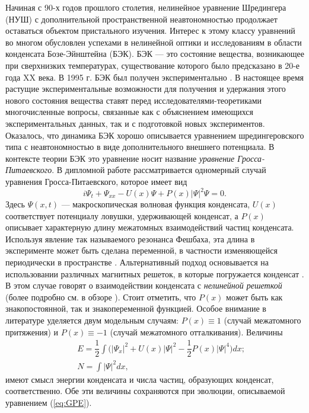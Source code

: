 \intro


Начиная с 90-х годов прошлого столетия, нелинейное уравнение Шредингера (НУШ) с дополнительной пространственной неавтономностью продолжает оставаться объектом пристального изучения.
Интерес к этому классу уравнений во многом обусловлен успехами в нелинейной оптики и исследованиям в области конденсата Бозе-Эйнштейна (БЭК).
БЭК --- это состояние вещества, возникающее при сверхнизких температурах, существование которого было предсказано в 20-е года XX века.
В 1995 г. БЭК был получен экспериментально \cite{Anderson}.
В настоящее время растущие экспериментальные возможности для получения и удержания этого нового состояния вещества ставят перед исследователями-теоретиками многочисленные вопросы, связанные как с объяснением имеющихся экспериментальных данных, так и с подготовкой новых экспериментов.
Оказалось, что динамика БЭК хорошо описывается уравнением шредингеровского типа с неавтономностью в виде дополнительного внешнего потенциала.
В контексте теории БЭК это уравнение носит название {\it уравнение Гросса-Питаевского}.
В дипломной работе рассматривается одномерный случай уравнения Гросса-Питаевского, которое имеет вид
%
\begin{equation}
i \Psi_t + \Psi_{xx} - U(x)\Psi + P(x)|\Psi|^2 \Psi = 0.
\label{eq:GPE}
\end{equation}
%
Здесь $\Psi(x, t)$ --- макроскопическая волновая функция конденсата, $U(x)$ соответствует потенциалу ловушки, удерживающей конденсат, а $P(x)$ описывает характерную длину межатомных взаимодействий частиц конденсата.
Используя явление так называемого резонанса Фешбаха, эта длина в эксперименте может быть сделана переменной, в частности изменяющейся периодически в пространстве \cite{Theis}.
Альтернативный подход основывается на использовании различных магнитных решеток, в которые погружается конденсат \cite{Jose}.
В этом случае говорят о взаимодействии конденсата с {\it нелинейной решеткой} (более подробно см. в обзоре \cite{Kartashov}).
Стоит отметить, что $P(x)$ может быть как знакопостоянной, так и знакопеременной функцией.
Особое внимание в литературе уделяется двум модельным случаям: $P(x) \equiv 1$ (случай межатомного притяжения) и $P(x) \equiv -1$ (случай межатомного отталкивания).
Величины
%
\begin{eqnarray}
&& E = \dfrac{1}{2} \int \Big( |\Psi_{x}|^2 + U(x) |\Psi|^2 - \dfrac{1}{2} P(x) |\Psi|^4 \Big) dx; \\ 
&& N = \int |\Psi|^2 dx,
\end{eqnarray}
%
имеют смысл энергии конденсата и числа частиц, образующих конденсат, соответственно.
Обе эти величины сохраняются при эволюции, описываемой уравнением (\ref{eq:GPE}).

